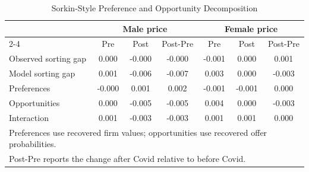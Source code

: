 \begin{table}[!htbp]\centering
\caption{Sorkin-Style Preference and Opportunity Decomposition}
\begin{tabular}{lcccccc}
\hline
 & \multicolumn{3}{c}{Male price} & \multicolumn{3}{c}{Female price} \\
\cline{2-4} \cline{5-7}
 & Pre & Post & Post-Pre & Pre & Post & Post-Pre
\\ \hline
Observed sorting gap & 0.000 & -0.000 & -0.000 & -0.001 & 0.000 & 0.001 \\
Model sorting gap & 0.001 & -0.006 & -0.007 & 0.003 & 0.000 & -0.003 \\
Preferences & -0.000 & 0.001 & 0.002 & -0.001 & -0.001 & 0.000 \\
Opportunities & 0.000 & -0.005 & -0.005 & 0.004 & 0.000 & -0.003 \\
Interaction & 0.001 & -0.003 & -0.003 & 0.001 & 0.001 & 0.000 \\
\hline
\multicolumn{7}{l}{\footnotesize{Preferences use recovered firm values; opportunities use recovered offer probabilities.}} \\
\multicolumn{7}{l}{\footnotesize{Post-Pre reports the change after Covid relative to before Covid.}} \\
\end{tabular}
\end{table}
